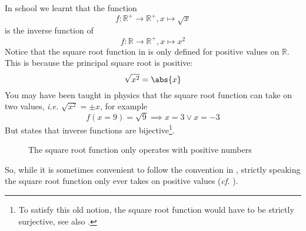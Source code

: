 \begin{rem}\label{rem-sqrt-function}
    In school we learnt that the function 
    \begin{equation}\label{eq-sqrt-function}
        f:\mathbb{R}^+\to\mathbb{R}^+,x\mapsto\sqrt{x}
    \end{equation}
    is the inverse function of
    \begin{equation}\label{eq-pow-function}
        f:\mathbb{R}\to\mathbb{R}^+,x\mapsto x^2
    \end{equation}
    Notice that the square root function in  is 
    only defined for positive values on $\mathbb{R}$. This is because the principal
    square root is positive:
    \begin{equation}\label{eq-sqrt-abs-function}
        \sqrt{x^2}=\abs{x}
    \end{equation}
    You may have been taught in physics that the square root function can take on
    two values, \textit{i.e.} $\sqrt{x^2}=\pm x$, for example
    \begin{equation*}
        f(x=9)=\sqrt{9}\implies x=3 \lor x=-3
    \end{equation*}
    But  states that inverse functions are 
    bijective\footnote{To satisfy this old notion, the square root function would
    have to be strictly surjective, see also .}.
    \begin{figure}[h!]
        \centering
        \caption{The square root function only operates with positive numbers}
        \label{sketch:rem-sqrt-function}
    \end{figure}
    So, while it is sometimes convenient to follow the convention in ,
    strictly speaking the square root function only ever takes on positive values
    (\textit{cf.} ).
\end{rem}

